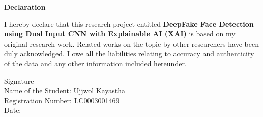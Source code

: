 \pagestyle{plain}
\vspace*{52pt}
\begin{center}
    \large{\textbf{Declaration}}\\[31pt]
\end{center}

I hereby declare that this research project entitled \textbf{DeepFake Face Detection using  Dual Input CNN with Explainable AI (XAI)} is based on my original research work. Related works on the topic by other researchers have been duly acknowledged. I owe all the liabilities relating to accuracy and authenticity of the data and any other information included hereunder.

\vspace{73pt}

\begin{flushleft}
    Signature \\
    Name of the Student: Ujjwol Kayastha \\
    Registration Number: LC0003001469 \\
    Date:
\end{flushleft}

